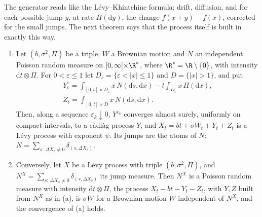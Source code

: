 The generator reads like the L\'evy--Khintchine formula: drift, diffusion, and for each possible jump $y$, at rate $\Pi(\mathrm dy)$, the change $f(x+y)-f(x)$, corrected for the small jumps. The next theorem says that the process
itself is built in exactly this way.

\begin{theorem}[L\'evy--It\^o, 1934--1942]\label{thm:levyito}
\begin{enumerate}[label=(\alph*)]
\item Let $(b,\sigma^2,\Pi)$ be a triple, $W$ a Brownian motion and $N$ an independent Poisson random measure on $[0,\infty[\times\R^*$, where $\R^*=\R\setminus\{0\}$, with intensity $\mathrm dt\otimes\Pi$. For
$0<\varepsilon\le1$ let $D_\varepsilon=\{\varepsilon<|x|\le1\}$ and $D=\{|x|>1\}$, and put
\begin{gather*}
Y^\varepsilon_t=\int_{[0,t]\times D_\varepsilon}x\,N(\mathrm ds,\mathrm dx)-t\int_{D_\varepsilon}x\,\Pi(\mathrm dx),\\
Z_t=\int_{[0,t]\times D}x\,N(\mathrm ds,\mathrm dx).
\end{gather*}
Then, along a sequence $\varepsilon_k\downarrow0$, $Y^{\varepsilon_k}$ converges almost surely, uniformly on compact intervals, to a c\`adl\`ag process $Y$, and $X_t=bt+\sigma W_t+Y_t+Z_t$ is a L\'evy process with exponent $\psi$.
Its jumps are the atoms of $N$: $N=\sum_{s:\,\Delta X_s\ne0}\delta_{(s,\Delta X_s)}$.
\item Conversely, let $X$ be a L\'evy process with triple $(b,\sigma^2,\Pi)$, and $N^X=\sum_{s:\,\Delta X_s\ne0}\delta_{(s,\Delta X_s)}$ its jump measure. Then $N^X$ is a Poisson random measure with intensity $\mathrm dt\otimes\Pi$, the process
$X_t-bt-Y_t-Z_t$, with $Y,Z$ built from $N^X$ as in (a), is $\sigma W$ for a Brownian motion $W$ independent of $N^X$, and the convergence of (a) holds.
\end{enumerate}
\end{theorem}

